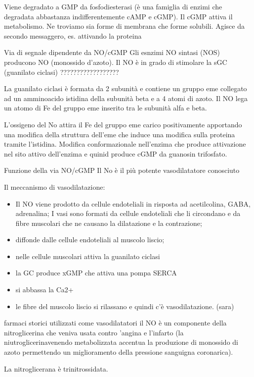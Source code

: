 \documentclass[]{article}
\begin{document}
Viene degradato a GMP da fosfodiesterasi (è una famiglia di enzimi che
degradata abbastanza indifferentemente cAMP e cGMP). Il cGMP attiva il
metabolismo. Ne troviamo sia forme di membrana che forme solubili.
Agisce da secondo messaggero, es. attivando la proteina

Via di segnale dipendente da NO/cGMP Gli esnzimi NO sintasi (NOS)
producono NO (monossido d'azoto). Il NO è in grado di stimolare la sGC
(guanilato ciclasi) ??????????????????

La guanilato ciclasi è formata da 2 subunità e contiene un gruppo eme
collegato ad un amminoacido istidina della subunità beta e a 4 atomi di
azoto. Il NO lega un atomo di Fe del gruppo eme inserito tra le subunità
alfa e beta.

L'ossigeno del No attira il Fe del gruppo eme carico positivamente
apportando una modifica della struttura dell'eme che induce una modifica
sulla proteina tramite l'istidina. Modifica conformazionale nell'enzima
che produce attivazione nel sito attivo dell'enzima e quinid produce
cGMP da guanosin trifosfato.

Funzione della via NO/cGMP Il No è il più potente vasodilatatore
conosciuto

Il meccanismo di vasodilatazione:

\begin{itemize}
\itemsep1pt\parskip0pt
\item
  Il NO viene prodotto da cellule endoteliali in risposta ad
  acetilcolina, GABA, adrenalina; I vasi sono formati da cellule
  endoteliali che li circondano e da fibre muscolari che ne causano la
  dilatazione e la contrazione;
\item
  diffonde dalle cellule endoteliali al muscolo liscio;
\item
  nelle cellule muscolari attiva la guanilato ciclasi
\item
  la GC produce xGMP che attiva una pompa SERCA
\item
  si abbassa la Ca2+
\item
  le fibre del muscolo liscio si rilassano e quindi c'è vasodilatazione.
  (sara)
\end{itemize}

farmaci storici utilizzati come vasodilatatori il NO è un componente
della nitroglicerina che veniva usata contro 'angina e l'infarto (la
niutroglicerinavenendo metabolizzata accentua la produzione di monossido
di azoto permettendo un miglioramento della pressione sanguigna
coronarica).

La nitroglicerana è trinitrossidata.
\end{document}
